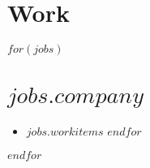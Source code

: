 \documentclass{resume}
\begin{document}
\section{Work}
$for(jobs)$
\section{$jobs.company$}
\begin{itemize}
  $for(jobs.workitems)$
  \item $jobs.workitems$
  $endfor$
\end{itemize}
$endfor$
\end{document}
